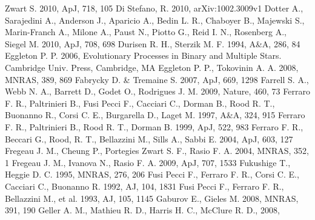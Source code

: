 \begin{thebibliography}{99}
  Zwart S. 2010, ApJ, 718, 105 
 Di Stefano, R. 2010, arXiv:1002.3009v1
  Dotter A., Sarajedini A., Anderson J., Aparicio A., Bedin L. R.,
  Chaboyer B., Majewski S., Marin-Franch A., Milone A., Paust N.,
  Piotto G., Reid I. N., Rosenberg A., Siegel M. 2010, ApJ, 708, 698
  Durisen R. H., Sterzik M. F. 1994, A\&A, 286, 84
  Eggleton P. P. 2006, Evolutionary Processes in Binary and Multiple
  Stars. Cambridge Univ. Press, Cambridge, MA
  Eggleton P. P., Tokovinin A. A. 2008, MNRAS, 389, 869
 Fabrycky D. \& Tremaine S. 2007, ApJ,
  669, 1298
  Farrell S. A., Webb N. A., Barrett D., Godet O., Rodrigues
  J. M. 2009, Nature, 460, 73
  Ferraro F. R., Paltrinieri B., Fusi Pecci F., Cacciari C., Dorman
  B., Rood R. T., Buonanno R., Corsi C. E., Burgarella D., Laget
  M. 1997, A\&A, 324, 915
  Ferraro F. R., Paltrinieri B., Rood R. T., Dorman B. 1999, ApJ, 522,
  983
  Ferraro F. R., Beccari G., Rood, R. T., Bellazzini M., Sills A.,
  Sabbi E. 2004, ApJ, 603, 127
  Fregeau J. M., Cheung P., Portegies Zwart S. F., Rasio F. A. 2004,
  MNRAS, 352, 1
 Fregeau J. M., Ivanova N., Rasio
  F. A. 2009, ApJ, 707, 1533
 Fukushige T., Heggie D. C. 1995,
  MNRAS, 276, 206
  Fusi Pecci F., Ferraro F. R., Corsi C. E., Cacciari C., Buonanno
  R. 1992, AJ, 104, 1831
  Fusi Pecci F., Ferraro F. R., Bellazzini M., et al. 1993, AJ, 105,
  1145
  Gaburov E., Gieles M. 2008, MNRAS, 391, 190
  Geller A. M., Mathieu R. D., Harris H. C., McClure R. D., 2008,

\end{thebibliography}
